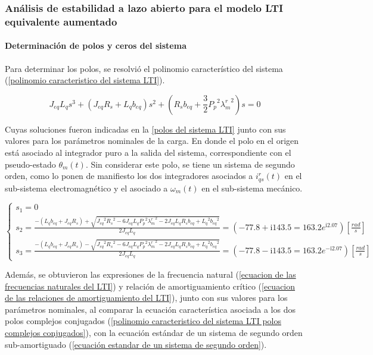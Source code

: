 \documentclass[a4paper, 10pt, onecolumn,journal]{ieeeconf}
\begin{document}
\subsubsection{\textbf{Análisis de estabilidad a lazo abierto para el modelo LTI equivalente aumentado}}
\paragraph{\textbf{Determinación de polos y ceros del sistema}}
Para determinar los polos, se resolvió el polinomio característico del sistema (\cref{polinomio caracteristico del sistema LTI}).

\begin{equation}
	J_{eq} L_{q} s^3 +\left( J_{eq} R_{s} + L_{q} b_{eq} \right)s^2 + \left( R_{s} b_{eq} + \dfrac{3}{2} {P_{p}}^2 { \lambda^r_m}^2\right) s = 0
    \label{polinomio caracteristico del sistema LTI}
\end{equation}

Cuyas soluciones fueron indicadas en la \cref{polos del sistema LTI} junto con sus valores
para los parámetros nominales de la carga.
En donde el polo en el origen está asociado al integrador puro a la salida
del sistema, correspondiente con
el pseudo-estado $\theta_m(t)$. Sin considerar este polo, se tiene un sistema de
segundo orden, como lo ponen de manifiesto los dos integradores asociados a $i^r_{qs}(t)$ en el
sub-sistema electromagnético y el asociado a $\omega_m(t)$ en el sub-sistema mecánico.

\begin{equation}
	\begin{cases}
		s_1 = 0\\
		s_2 = \frac{-\left( L_{q} b_{eq} + J_{eq} R_{s}\right)  + \sqrt{{J_{eq}}^2 {R_{s}}^2 - 6 J_{eq} L_{q} {P_{p}}^2 {\lambda^r_m}^2 - 2 J_{eq} L_{q} R_{s} b_{eq}+{L_{q}}^2 {b_{eq}}^2} }{2 J_{eq} L_{q}} = \left(-77.8+\mathrm{i}143.5 = 163.2e^{\mathrm{i}2.07}\right)\left[\frac{rad}{s}\right]\\
		s_3 = \frac{-\left( L_{q} b_{eq} + J_{eq} R_{s}\right)  - \sqrt{{J_{eq}}^2 {R_{s}}^2 - 6 J_{eq} L_{q} {P_{p}}^2 {\lambda^r_m}^2 - 2 J_{eq} L_{q} R_{s} b_{eq}+{L_{q}}^2 {b_{eq}}^2} }{2 J_{eq} L_{q}} = \left(-77.8-\mathrm{i}143.5 = 163.2e^{-\mathrm{i}2.07}\right)\left[\frac{rad}{s}\right]
	\end{cases}\label{polos del sistema LTI}
\end{equation}

Además, se obtuvieron las expresiones de la frecuencia natural (\cref{ecuacion de las frecuencias naturales del LTI}) y relación de amortiguamiento crítico (\cref{ecuacion de las relaciones de amortiguamiento del LTI}), junto con sus valores
para los parámetros nominales, al comparar la ecuación característica asociada a los dos polos complejos conjugados (\cref{polinomio caracteristico del sistema LTI polos complejos conjugados}), con  la ecuación estándar de un sistema de segundo orden sub-amortiguado (\cref{ecuación estandar de un sistema de segundo orden}).
\end{document}
